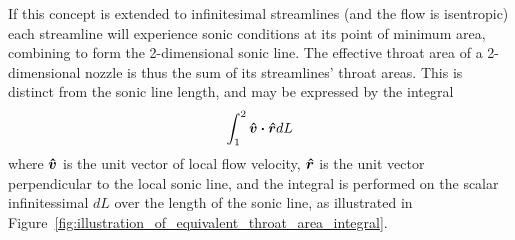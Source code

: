 \documentclass[11pt, twoside]{report}
\begin{document}
If this concept is extended to infinitesimal streamlines (and the flow is isentropic) each streamline will experience sonic conditions at its point of minimum area, combining to form the 2-dimensional sonic line. The effective throat area of a 2-dimensional nozzle is thus the sum of its streamlines' throat areas. This is distinct from the sonic line length, and may be expressed by the integral
\begin{equation}
	\int_{1}^2 \vu*{v} \vdot \vu*{r} dL
\end{equation}
where $\vu*{v}$ is the unit vector of local flow velocity, $\vu*{r}$ is the unit vector perpendicular to the local sonic line, and the integral is performed on the scalar infinitessimal $dL$ over the length of the sonic line, as illustrated in Figure~\ref{fig:illustration_of_equivalent_throat_area_integral}.
 		
\end{document}
